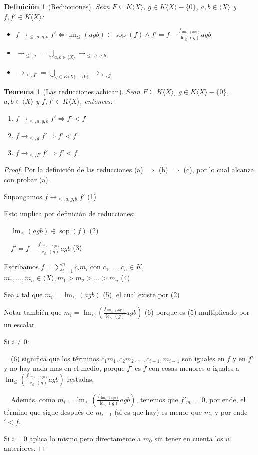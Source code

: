 \documentclass{amsbook} %
\theoremstyle{customstyle}
\newtheorem{definition}{Definición}[section]
\newtheorem{theorem}{Teorema}[section]
\DeclareMathOperator{\sop}{sop}
\DeclareMathOperator{\lm}{lm}
\DeclareMathOperator{\lc}{lc}
\begin{document}
\begin{definition}[Reducciones]
Sean $F ⊆ K⟨X⟩$, $g ∈ K⟨X⟩ - \{0\}$, $a, b ∈ ⟨X⟩$ y $f, f' ∈ K⟨X⟩$:
\begin{itemize}
\item $f →_{≤, a, g, b} f' ⇔ \lm_≤(agb) ∈ \sop(f) ∧ f' = f - \frac{f_{\lm_≤(agb)}}{\lc_≤(g)}agb$
\item $→_{≤, g} = ⋃_{a, b ∈ ⟨X⟩} →_{≤, a, g, b}$
\item $→_{≤, F} = ⋃_{g ∈ K⟨X⟩ - \{0\}} →_{≤, g}$
\end{itemize}
\end{definition}

\begin{theorem}[Las reducciones achican]\label{thm:→ achican}
Sean $F ⊆ K⟨X⟩$, $g ∈ K⟨X⟩ - \{0\}$, $a, b ∈ ⟨X⟩$ y $f, f' ∈ K⟨X⟩$, entonces:
\begin{enumerate}[label = (\alph*)]
\item $f →_{≤, a, g, b} f' ⇒ f' < f$

\item $f →_{≤, g} f' ⇒ f' < f$

\item $f →_{≤, F} f' ⇒ f' < f$
\end{enumerate}
\end{theorem}
\begin{proof}
Por la definición de las reducciones (a) $⇒$ (b) $⇒$ (c), por lo cual alcanza con probar (a).

Supongamos $f →_{≤, a, g, b} f'$ (1)

Esto implica por definición de reducciones:

  $\lm_≤(agb) ∈ \sop(f)$ (2)

  $f' = f - \frac{f_{\lm_≤(agb)}}{\lc_≤(g)}agb$ (3)

Escribamos $f = ∑_{i = 1}^n c_i m_i$ con $c_1, …, c_n ∈ K$, $m_1, …, m_n ∈ ⟨X⟩, m_1 > m_2 > … > m_n$ (4)

Sea $i$ tal que $m_i = \lm_≤(agb)$ (5), el cual existe por (2)

Notar también que $m_i = \lm_≤(\frac{f_{\lm_≤(agb)}}{\lc_≤(g)}agb)$ (6) porque es (5) multiplicado por un escalar

Si $i ≠ 0$:

  (6) significa que los términos $c_1 m_1, c_2 m_2, …, c_{i-1}, m_{i-1}$ son iguales en $f$ y en $f'$ y no hay nada mas en el medio, porque $f'$ es $f$ con cosas menores o iguales a $\lm_≤(\frac{f_{\lm_≤(agb)}}{\lc_≤(g)}agb)$ restadas.

  Además, como $m_i = \lm_≤(\frac{f_{\lm_≤(agb)}}{\lc_≤(g)}agb)$, tenemos que $f'_{m_i} = 0$, por ende, el término que sigue después de $m_{i-1}$ (si es que hay) es menor que $m_i$ y por ende $' < f$.

Si $i = 0$ aplica lo mismo pero directamente a $m_0$ sin tener en cuenta los $w$ anteriores.

\end{proof}
\end{document}
